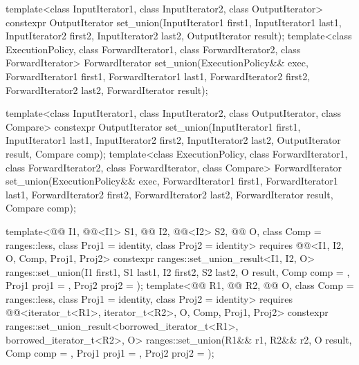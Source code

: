 %
\begin{itemdecl}
template<class InputIterator1, class InputIterator2, class OutputIterator>
  constexpr OutputIterator
    set_union(InputIterator1 first1, InputIterator1 last1,
              InputIterator2 first2, InputIterator2 last2,
              OutputIterator result);
template<class ExecutionPolicy, class ForwardIterator1, class ForwardIterator2,
         class ForwardIterator>
  ForwardIterator
    set_union(ExecutionPolicy&& exec,
              ForwardIterator1 first1, ForwardIterator1 last1,
              ForwardIterator2 first2, ForwardIterator2 last2,
              ForwardIterator result);

template<class InputIterator1, class InputIterator2, class OutputIterator, class Compare>
  constexpr OutputIterator
    set_union(InputIterator1 first1, InputIterator1 last1,
              InputIterator2 first2, InputIterator2 last2,
              OutputIterator result, Compare comp);
template<class ExecutionPolicy, class ForwardIterator1, class ForwardIterator2,
         class ForwardIterator, class Compare>
  ForwardIterator
    set_union(ExecutionPolicy&& exec,
              ForwardIterator1 first1, ForwardIterator1 last1,
              ForwardIterator2 first2, ForwardIterator2 last2,
              ForwardIterator result, Compare comp);

template<@@ I1, @@<I1> S1, @@ I2, @@<I2> S2,
         @@ O, class Comp = ranges::less,
         class Proj1 = identity, class Proj2 = identity>
  requires @@<I1, I2, O, Comp, Proj1, Proj2>
  constexpr ranges::set_union_result<I1, I2, O>
    ranges::set_union(I1 first1, S1 last1, I2 first2, S2 last2, O result, Comp comp = {},
                      Proj1 proj1 = {}, Proj2 proj2 = {});
template<@@ R1, @@ R2, @@ O,
         class Comp = ranges::less, class Proj1 = identity, class Proj2 = identity>
  requires @@<iterator_t<R1>, iterator_t<R2>, O, Comp, Proj1, Proj2>
  constexpr ranges::set_union_result<borrowed_iterator_t<R1>, borrowed_iterator_t<R2>, O>
    ranges::set_union(R1&& r1, R2&& r2, O result, Comp comp = {},
                      Proj1 proj1 = {}, Proj2 proj2 = {});


\end{itemdecl}
